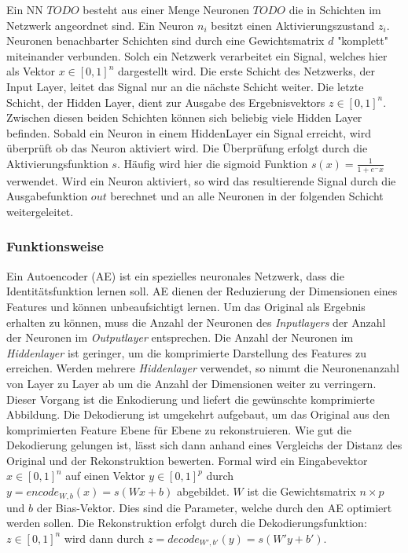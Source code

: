 Ein NN $ TODO $ besteht aus einer Menge Neuronen $ TODO $ die in Schichten im Netzwerk angeordnet sind. Ein Neuron $n_i$ besitzt einen Aktivierungszustand $z_i$.  Neuronen benachbarter Schichten sind durch eine Gewichtsmatrix $d$ "komplett" miteinander verbunden. Solch ein Netzwerk verarbeitet ein Signal, welches hier als Vektor $x \in [0,1]^n$ dargestellt wird. Die erste Schicht des Netzwerks, der Input Layer, leitet das Signal nur an die nächste Schicht weiter. Die letzte Schicht, der Hidden Layer, dient zur Ausgabe des Ergebnisvektors $z \in [0,1]^n$. Zwischen diesen beiden Schichten können sich beliebig viele Hidden Layer befinden. Sobald ein Neuron in einem HiddenLayer ein Signal erreicht, wird überprüft ob das Neuron aktiviert wird. Die Überprüfung erfolgt durch die Aktivierungsfunktion $s$. Häufig wird hier die sigmoid Funktion $s(x) = \frac{1}{1+e^-x}$ verwendet. Wird ein Neuron aktiviert, so wird das resultierende Signal durch die Ausgabefunktion $out$ berechnet und an alle Neuronen in der folgenden Schicht weitergeleitet. 

\subsubsection{Funktionsweise}
Ein Autoencoder (AE) ist ein spezielles neuronales Netzwerk, dass die Identitätsfunktion lernen soll. AE dienen der Reduzierung der Dimensionen eines Features und können unbeaufsichtigt lernen. Um das Original als Ergebnis erhalten zu können, muss die Anzahl der Neuronen des \textit{Inputlayers} der Anzahl der Neuronen im \textit{Outputlayer} entsprechen. Die Anzahl der Neuronen im \textit{Hiddenlayer} ist geringer, um die komprimierte Darstellung des Features zu erreichen. Werden mehrere \textit{Hiddenlayer} verwendet, so nimmt die Neuronenanzahl von Layer zu Layer ab um die Anzahl der Dimensionen weiter zu verringern. Dieser Vorgang ist die Enkodierung und liefert die gewünschte komprimierte Abbildung. Die Dekodierung ist umgekehrt aufgebaut, um das Original aus den komprimierten Feature Ebene für Ebene zu rekonstruieren. Wie gut die Dekodierung gelungen ist, lässt sich dann anhand eines Vergleichs der Distanz des Original und der Rekonstruktion bewerten. Formal wird ein Eingabevektor $x \in [0,1]^n$ auf einen Vektor $y \in [0,1]^p$ durch $y = encode_{W,b}(x) = s(Wx + b)$ abgebildet. $W$ ist die Gewichtsmatrix $n \times p$ und $b$ der Bias-Vektor. Dies sind die Parameter, welche durch den AE optimiert werden sollen. Die Rekonstruktion erfolgt durch die Dekodierungsfunktion:$z \in [0, 1]^n$ wird dann durch $z = decode_{W', b'}(y) = s(W'y + b')$.

